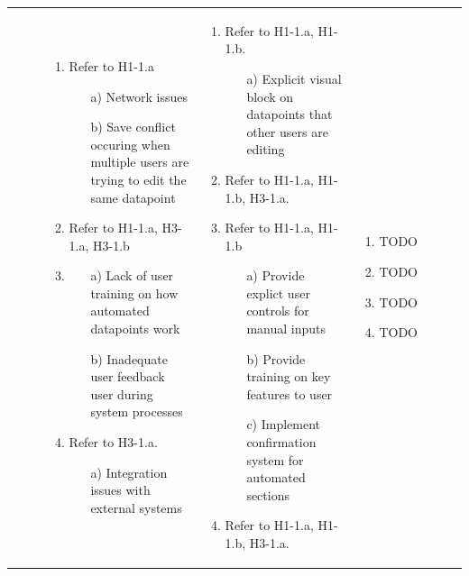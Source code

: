 \documentclass{article}
\begin{document}
\begin{landscape}
\begin{longtable}{|p{3cm}|p{3cm}|p{4cm}|p{4cm}|p{3cm}|p{2cm}|p{3cm}|}
\begin{enumerate}[leftmargin=*]
  \end{enumerate} &
  \begin{enumerate}[leftmargin=*]
       \item Refer to H1-1.a
       \begin{enumerate}
            \item[a)] Network issues
            \item[b)] Save conflict occuring when multiple users are trying to edit the same datapoint
        \end{enumerate}
       \item Refer to H1-1.a, H3-1.a, H3-1.b
       \item 
       \begin{enumerate}
            \item[a)] Lack of user training on how automated datapoints work
            \item[b)] Inadequate user feedback user during system processes
        \end{enumerate}
       \item Refer to H3-1.a.
       \begin{enumerate}
            \item[a)] Integration issues with external systems
        \end{enumerate}
  \end{enumerate} &
  \begin{enumerate}[leftmargin=*]
    \item Refer to H1-1.a, H1-1.b.
    \begin{enumerate}
        \item[a)] Explicit visual block on datapoints that other users are editing
    \end{enumerate}
    \item Refer to H1-1.a, H1-1.b, H3-1.a.
    \item Refer to H1-1.a, H1-1.b
    \begin{enumerate}
        \item[a)] Provide explict user controls for manual inputs
        \item[b)] Provide training on key features to user
        \item[c)] Implement confirmation system for automated sections
    \end{enumerate}
    \item Refer to H1-1.a, H1-1.b, H3-1.a.
  \end{enumerate} &
  \begin{enumerate}[leftmargin=*]
    \item TODO
    \item TODO
    \item TODO
    \item TODO


\end{enumerate}
\end{longtable}
\end{landscape}
\end{document}
